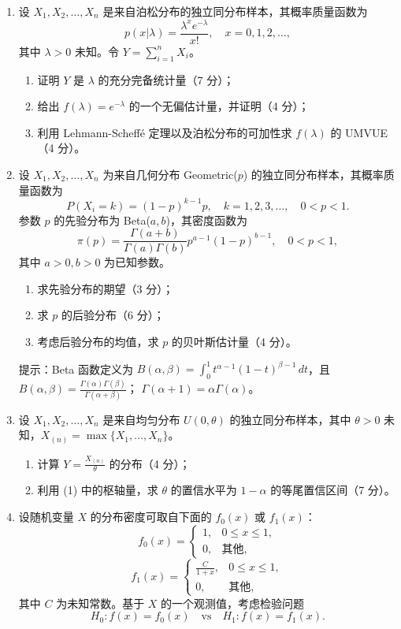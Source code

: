 \begin{enumerate}
\item 设 $X_1, X_2, \dots, X_n$ 是来自泊松分布的独立同分布样本，其概率质量函数为
\[
p(x|\lambda)=\frac{\lambda^x e^{-\lambda}}{x!}, \quad x=0,1,2,\dots,
\]
其中 $\lambda > 0$ 未知。令 $Y = \sum_{i=1}^n X_i$。

\begin{enumerate}
\item 证明 $Y$ 是 $\lambda$ 的充分完备统计量（7 分）；
\item 给出 $f(\lambda)=e^{-\lambda}$ 的一个无偏估计量，并证明（4 分）；
\item 利用 Lehmann-Scheffé 定理以及泊松分布的可加性求 $f(\lambda)$ 的 UMVUE（4 分）。
\end{enumerate}

\item 设 $X_1, X_2, \dots, X_n$ 为来自几何分布 Geometric($p$) 的独立同分布样本，其概率质量函数为
\[
P(X_i=k)=(1-p)^{k-1}p, \quad k=1,2,3,\dots, \quad 0<p<1.
\]
参数 $p$ 的先验分布为 Beta($a, b$)，其密度函数为
\[
\pi(p)=\frac{\Gamma(a+b)}{\Gamma(a)\Gamma(b)} p^{a-1}(1-p)^{b-1}, \quad 0<p<1,
\]
其中 $a>0, b>0$ 为已知参数。

\begin{enumerate}
\item 求先验分布的期望（3 分）；
\item 求 $p$ 的后验分布（6 分）；
\item 考虑后验分布的均值，求 $p$ 的贝叶斯估计量（4 分）。
\end{enumerate}

提示：Beta 函数定义为 $B(\alpha, \beta)=\int_0^1 t^{\alpha-1}(1-t)^{\beta-1}\,dt$，且 $B(\alpha, \beta)=\frac{\Gamma(\alpha)\Gamma(\beta)}{\Gamma(\alpha+\beta)}$；
$\Gamma(\alpha+1)=\alpha\Gamma(\alpha)$。

\item 设 $X_1, X_2, \dots, X_n$ 是来自均匀分布 $U(0, \theta)$ 的独立同分布样本，其中 $\theta > 0$ 未知，$X_{(n)} = \max\{X_1, \dots, X_n\}$。

\begin{enumerate}
\item 计算 $Y = \frac{X_{(n)}}{\theta}$ 的分布（4 分）；
\item 利用 (1) 中的枢轴量，求 $\theta$ 的置信水平为 $1-\alpha$ 的等尾置信区间（7 分）。
\end{enumerate}

\item 设随机变量 $X$ 的分布密度可取自下面的 $f_0(x)$ 或 $f_1(x)$：
\[
f_0(x)=\begin{cases}
1, & 0\le x\le 1, \\
0, & \text{其他},
\end{cases}
\]
\[
f_1(x)=\begin{cases}
\frac{C}{1+x}, & 0\le x\le 1, \\
0, & \text{其他},
\end{cases}
\]
其中 $C$ 为未知常数。基于 $X$ 的一个观测值，考虑检验问题
\[
H_0: f(x)=f_0(x) \quad \text{vs} \quad H_1: f(x)=f_1(x).
\]


\end{enumerate}
